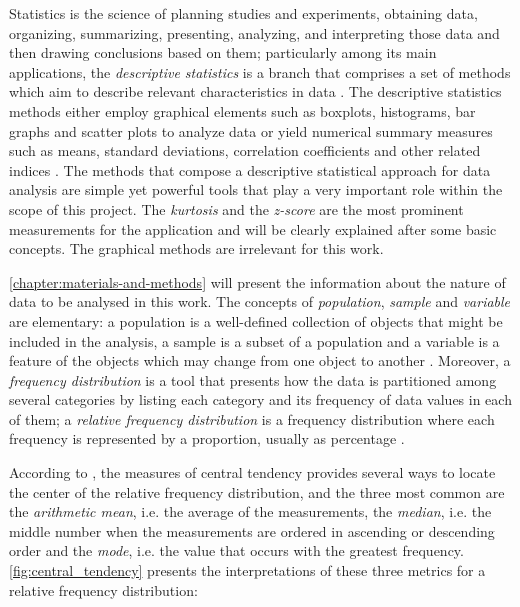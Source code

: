 Statistics is the science of planning studies and experiments, obtaining data, organizing, summarizing, presenting, analyzing, and interpreting those data and then drawing conclusions based on them; particularly among its main applications, the \emph{descriptive statistics} is a branch that comprises a set of methods which aim to describe relevant characteristics in data \cite{triola2017elementary}. The descriptive statistics methods either employ graphical elements such as boxplots, histograms, bar graphs and scatter plots to analyze data or yield numerical summary measures such as means, standard deviations, correlation coefficients and other related indices \cite{devore2011probability}. The methods that compose a descriptive statistical approach for data analysis are simple yet powerful tools that play a very important role within the scope of this project. The \emph{kurtosis} and the \emph{z-score} are the most prominent measurements for the application and will be clearly explained after some basic concepts. The graphical methods are irrelevant for this work.

\autoref{chapter:materials-and-methods} will present the information about the nature of data to be analysed in this work. The concepts of \emph{population}, \emph{sample} and \emph{variable} are elementary: a population is a well-defined collection of objects that might be included in the analysis, a sample is a subset of a population and a variable is a feature of the objects which may change from one object to another \cite{devore2011probability}. Moreover, a \emph{frequency distribution} is a tool that presents how the data is partitioned among several categories by listing each category and its frequency of data values in each of them; a \emph{relative frequency distribution} is a frequency distribution where each frequency is represented by a proportion, usually as percentage \cite{triola2017elementary}.


According to , the measures of central tendency provides several ways to locate the center of the relative frequency distribution, and the three most common are the \emph{arithmetic mean}, i.e. the average of the measurements, the \emph{median}, i.e. the middle number when the measurements are ordered in ascending or descending order and the \emph{mode}, i.e. the value that occurs with the greatest frequency. \autoref{fig:central_tendency} presents the interpretations of these three metrics for a relative frequency distribution:

